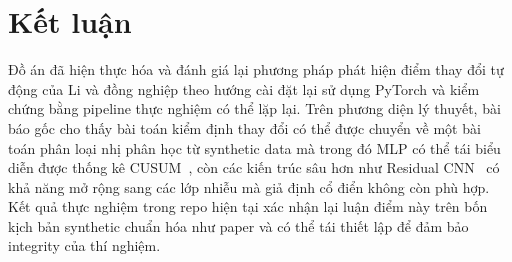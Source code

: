 \section{Kết luận}

Đồ án đã hiện thực hóa và đánh giá lại phương pháp phát hiện điểm thay đổi tự động
của Li và đồng nghiệp \cite{li2024automatic} theo hướng cài đặt lại sử dụng PyTorch và 
kiểm chứng bằng pipeline thực nghiệm có thể lặp lại. 
Trên phương diện lý thuyết, bài báo gốc cho thấy bài toán kiểm định thay đổi có
 thể được chuyển về một bài toán phân loại nhị phân học từ synthetic data mà trong đó MLP 
 có thể tái biểu diễn được thống kê CUSUM~\cite{page1954cusum}, 
 còn các kiến trúc sâu hơn như Residual CNN~\cite{he2016resnet} có khả năng mở rộng 
 sang các lớp nhiễu mà giả định cổ điển không còn phù hợp. 
 Kết quả thực nghiệm trong repo hiện tại xác nhận lại luận điểm này trên bốn kịch bản 
 synthetic chuẩn hóa như paper và có thể tái thiết lập để đảm bảo integrity của thí nghiệm.


